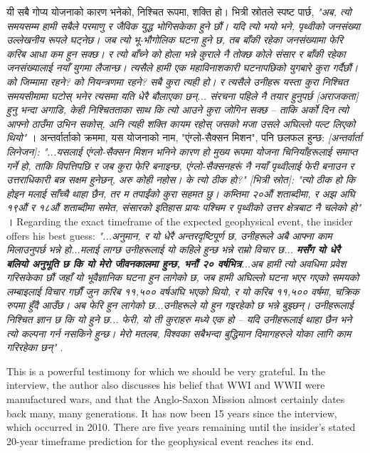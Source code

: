 \documentclass[10pt,twocolumn,letterpaper]{article}
\begin{document}
यी सबै गोप्य योजनाको कारण भनेको, निश्चित रूपमा, शक्ति हो। भित्री स्रोतले स्पष्ट पार्छ, \textit{"अब, त्यो समयसम्म हामी सबैले परमाणु र जैविक युद्ध भोगिसकेका हुने छौं। यदि त्यो भयो भने, पृथ्वीको जनसंख्या उल्लेखनीय रूपले घट्नेछ। जब त्यो भू-भौगोलिक घटना हुने छ, तब बाँकी रहेका जनसंख्यामा फेरि करिब आधा कम हुन सक्छ। र त्यो बाँच्ने को होला भन्ने कुराले नै तोक्छ कोले संसार र बाँकी रहेका जनसंख्यालाई नयाँ युगमा लैजान्छ। त्यसैले हामी एक महाविनाशकारी घटनापछिको युगबारे कुरा गर्दैछौं। को जिम्मामा रहने? को नियन्त्रणमा रहने? सबै कुरा त्यही हो। र त्यसैले उनीहरू यस्ता कुरा निश्चित समयसीमामा घटोस् भनेर त्यसमा यति धेरै बौलाएका छन्... संरचना पहिले नै तयार हुनुपर्छ [अराजकता] हुनु भन्दा अगाडि, केही निश्चितताका साथ कि त्यो आउने कुरा जोगिन सक्छ -- ताकि अर्को दिन त्यो आफ्नो ठाउँमा उभिन सकोस्, अनि त्यही शक्ति कायम रहोस् जसको मजा उसले अघिल्लो पल्ट लिएको थियो"} \cite{4}। अन्तर्वार्ताको क्रममा, यस योजनाको नाम, "एंग्लो-सैक्सन मिशन", पनि छलफल हुन्छ: \textit{[अन्तर्वार्ता लिनेजन]: "...यसलाई एंग्लो-सैक्सन मिशन भनिने कारण हो मुख्य रूपमा योजना चिनियाँहरूलाई समाप्त गर्ने हो, ताकि विपत्तिपछि र जब कुरा फेरि बनाइन्छ, एंग्लो-सैक्सनहरूं नै नयाँ पृथ्वीलाई फेरी बनाउन र उत्तराधिकारी बन्न सक्षम हुनेछन्, अरु कोही नहोस। के त्यो ठीक हो?" [भित्री स्रोत]: "त्यो ठीक हो कि होइन मलाई साँच्चै थाहा छैन, तर म तपाईंको कुरा सहमत छु। कम्तिमा २०औं शताब्दीमा, र अझ अघि १९औं र १८औं शताब्दीमा समेत, संसारको इतिहास प्रायः पश्चिम र पृथ्वीको उत्तर क्षेत्रबाट नै चलेको हो"} \cite{4}।
Regarding the exact timeframe of the expected geophysical event, the insider offers his best guess: \textit{"...अनुमान, र यो धेरै अन्तरदृष्टिपूर्ण छ, उनीहरूले अबै आफ्ना काम मिलाउनुपर्छ भन्ने हो...मलाई लाग्छ उनीहरूलाई यो कहिले हुन्छ भन्ने राम्रो विचार छ... \textbf{मसँग यो धेरै बलियो अनुभूति छ कि यो मेरो जीवनकालमा हुन्छ, भनौं २० वर्षभित्र}...अब हामी त्यो अवधिमा प्रवेश गरिसकेका छौं जहाँ यो भूवैज्ञानिक घटना हुन लागेको छ, जब हामी अघिल्लो घटना भएर गएको समयको लम्बाइलाई विचार गर्छौं जुन करिब ११,५०० वर्षअघि भएको थियो, र यो करिब ११,५०० वर्षमा, चक्रिक रुपमा हुँदै आउँछ। अब फेरि हुन लागेको छ...उनीहरूले यो हुन गइरहेको छ भन्ने बुझ्छन्। उनीहरूलाई निश्चित ज्ञान छ कि यो हुने छ... फेरी, यो ती कुराहरु मध्ये एक हो -- यदि उनीहरूलाई थाहा छैन भने त्यो कल्पना गर्न नसकिने हुन्छ। मेरो मतलब, विश्वका सबैभन्दा बुद्धिमान दिमागहरुले योका लागि काम गरिरहेका छन्"} \cite{4}.

This is a powerful testimony for which we should be very grateful. In the interview, the author also discusses his belief that WWI and WWII were manufactured wars, and that the Anglo-Saxon Mission almost certainly dates back many, many generations. It has now been 15 years since the interview, which occurred in 2010. There are five years remaining until the insider's stated 20-year timeframe prediction for the geophysical event reaches its end.
\end{document}
